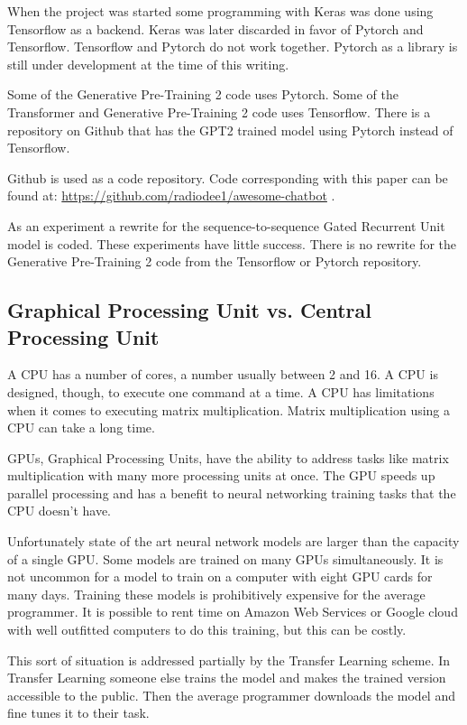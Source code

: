 When the project was started some programming with Keras was done using Tensorflow as a backend. Keras was later discarded in favor of Pytorch and Tensorflow. Tensorflow and Pytorch do not work together. Pytorch as a library is still under development at the time of this writing.

Some of the Generative Pre-Training 2 code uses Pytorch. Some of the Transformer and Generative Pre-Training 2 code uses Tensorflow. There is a repository on Github that has the GPT2 trained model using Pytorch instead of Tensorflow.

Github is used as a code repository. Code corresponding with this paper can be found at: \href{https://github.com/radiodee1/awesome-chatbot}{https://github.com/radiodee1/awesome-chatbot} . 

As an experiment a rewrite for the sequence-to-sequence Gated Recurrent Unit model is coded. These experiments have little success. There is no rewrite for the Generative Pre-Training 2 code from the Tensorflow or Pytorch repository.

\subsection{Graphical Processing Unit vs. Central Processing Unit}

A CPU has a number of cores, a number usually between 2 and 16. A CPU is designed, though, to execute one command at a time. A CPU has limitations when it comes to executing matrix multiplication. Matrix multiplication using a CPU can take a long time.

GPUs, Graphical Processing Units, have the ability to address tasks like matrix multiplication with many more processing units at once. The GPU speeds up parallel processing and has a benefit to neural networking training tasks that the CPU doesn't have.

Unfortunately state of the art neural network models are larger than the capacity of a single GPU. Some models are trained on many GPUs simultaneously. It is not uncommon for a model to train on a computer with eight GPU cards for many days. Training these models is prohibitively expensive for the average programmer. It is possible to rent time on Amazon Web Services or Google cloud with well outfitted computers to do this training, but this can be costly.

This sort of situation is addressed partially by the Transfer Learning scheme. In Transfer Learning someone else trains the model and makes the trained version accessible to the public. Then the average programmer downloads the model and fine tunes it to their task.

